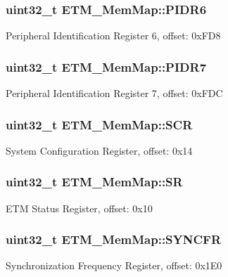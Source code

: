 \subsubsection[{P\+I\+D\+R6}]{\setlength{\rightskip}{0pt plus 5cm}uint32\+\_\+t E\+T\+M\+\_\+\+Mem\+Map\+::\+P\+I\+D\+R6}\label{struct_e_t_m___mem_map_a2c8b019b70ddbec18c4ee65fa670f6f7}
Peripheral Identification Register 6, offset\+: 0x\+F\+D8 \hypertarget{struct_e_t_m___mem_map_ad50208a539be49c2689ceae20ad53af4}{}
\subsubsection[{P\+I\+D\+R7}]{\setlength{\rightskip}{0pt plus 5cm}uint32\+\_\+t E\+T\+M\+\_\+\+Mem\+Map\+::\+P\+I\+D\+R7}\label{struct_e_t_m___mem_map_ad50208a539be49c2689ceae20ad53af4}
Peripheral Identification Register 7, offset\+: 0x\+F\+D\+C \hypertarget{struct_e_t_m___mem_map_a21304c0be7e04790f0c022f40d2ef1aa}{}
\subsubsection[{S\+C\+R}]{\setlength{\rightskip}{0pt plus 5cm}uint32\+\_\+t E\+T\+M\+\_\+\+Mem\+Map\+::\+S\+C\+R}\label{struct_e_t_m___mem_map_a21304c0be7e04790f0c022f40d2ef1aa}
System Configuration Register, offset\+: 0x14 \hypertarget{struct_e_t_m___mem_map_af91fa67ecfbfa6eb2d20588bbf32215b}{}
\subsubsection[{S\+R}]{\setlength{\rightskip}{0pt plus 5cm}uint32\+\_\+t E\+T\+M\+\_\+\+Mem\+Map\+::\+S\+R}\label{struct_e_t_m___mem_map_af91fa67ecfbfa6eb2d20588bbf32215b}
E\+T\+M Status Register, offset\+: 0x10 \hypertarget{struct_e_t_m___mem_map_af01a13d412cdc4037d95e27ac51c64bd}{}
\subsubsection[{S\+Y\+N\+C\+F\+R}]{\setlength{\rightskip}{0pt plus 5cm}uint32\+\_\+t E\+T\+M\+\_\+\+Mem\+Map\+::\+S\+Y\+N\+C\+F\+R}\label{struct_e_t_m___mem_map_af01a13d412cdc4037d95e27ac51c64bd}
Synchronization Frequency Register, offset\+: 0x1\+E0 \hypertarget{struct_e_t_m___mem_map_a190e1e7ffbcf9b1b6c6d543aa4e1fbc4}{}
